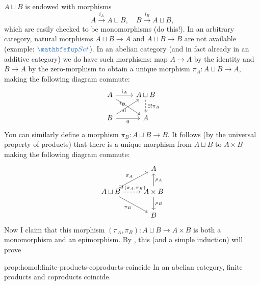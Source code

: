 $A \sqcup B$ is endowed with morphisms
\[
  A \xrightarrow{i_A} A \sqcup B, \quad B \xrightarrow{i_B} A \sqcup
  B,
\]
which are easily checked to be monomorphisms (do this!). In an
arbitrary category, natural morphisms $A \sqcup B \to A$ and
$A \sqcup B \to B$ are not available (example: $\categ{Set}$).  In an
abelian category (and in fact already in an additive category) we do
have such morphisms: map $A \to A$ by the identity and $B \to A$ by
the zero-morphism to obtain a unique morphism
$\pi_A : A \sqcup B \to A$, making the following diagram commute:
\[\begin{tikzcd}
    A \arrow[r, "i_A"] \arrow[dr, "\id"'] &
    A \sqcup B \arrow[d, dashed, "\exists! \pi_A"] \\
    B \arrow[ur, "i_B"] \arrow[r, "0"'] & A
  \end{tikzcd}\] You can similarly define a morphism
$\pi_B : A \sqcup B \to B$. It follows (by the universal property of
products) that there is a unique morphism from $A \sqcup B$ to
$A \times B$ making the following diagram commute:
\[\begin{tikzcd}
    & A \\
    A \sqcup B \arrow[ur, "\pi_A"] \arrow[dr, "\pi_B"'] \arrow[r,
    dashed, "{\exists! \, (\pi_A, \pi_B)}"] &
    A \times B \arrow[u, "\rho_A"'] \arrow[d, "\rho_B"] \\
    & B
  \end{tikzcd}\] Now I claim that this morphism
$(\pi_A, \pi_B) : A \sqcup B \to A \times B$ is both a monomorphism
and an epimorphism. By , this (and a simple
induction) will prove

\begin{prop}{}{prop:homol:finite-products-coproducts-coincide}
  In an abelian category, finite products and coproducts coincide.
\end{prop}

